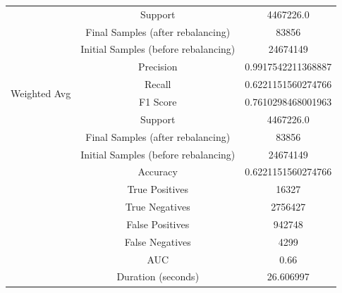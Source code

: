 \begin{longtable}{|c|c|c|}
 & Support & 4467226.0 \\
 & Final Samples (after rebalancing) & 83856 \\
 & Initial Samples (before rebalancing) & 24674149 \\
\hline
\multirow{4}{*}{Weighted Avg} & Precision & 0.9917542211368887 \\
 & Recall & 0.6221151560274766 \\
 & F1 Score & 0.7610298468001963 \\
 & Support & 4467226.0 \\
 & Final Samples (after rebalancing) & 83856 \\
 & Initial Samples (before rebalancing) & 24674149 \\
\hline
& Accuracy & 0.6221151560274766 \\ \hline
& True Positives & 16327 \\ \hline
& True Negatives & 2756427 \\ \hline
& False Positives & 942748 \\ \hline
& False Negatives & 4299 \\ \hline
& AUC & 0.66 \\ \hline
& Duration (seconds) & 26.606997 \\ \hline
\end{longtable}


